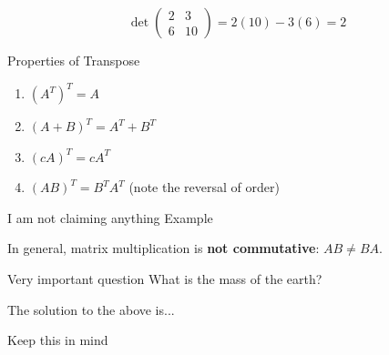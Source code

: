 \documentclass[12pt, a4paper]{extarticle}
\begin{document}
\begin{example}
\[
\det\begin{pmatrix} 2 & 3 \\ 6 & 10 \end{pmatrix} = 2(10) - 3(6) = 2
\]
\end{example}

\begin{property}{Properties of Transpose}{}
\begin{enumerate}
	\item $(A^T)^T = A$
	\item $(A + B)^T = A^T + B^T$
	\item $(cA)^T = cA^T$
	\item $(AB)^T = B^TA^T$ (note the reversal of order)
\end{enumerate}
\end{property}



\begin{claim}{I am not claiming anything}{}
	Example
\end{claim}

\begin{remark}
	In general, matrix multiplication is \textbf{not commutative}: $AB \neq BA$.
\end{remark}

\begin{qs}{Very important question}{}
	What is the mass of the earth?
\end{qs}

The solution to the above is...

\begin{note}
	Keep this in mind
\end{note}
\end{document}

